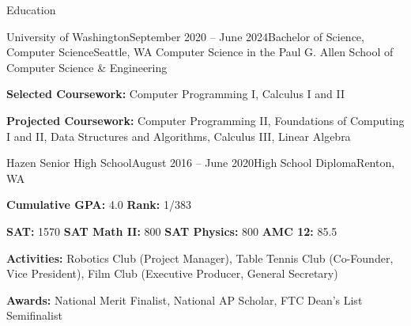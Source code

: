 \documentclass{resume} %
\begin{document}
\begin{rSection}{Education}
    \begin{rSubsection}{University of Washington}{September 2020 – June 2024}{Bachelor of Science, Computer Science}{Seattle, WA}
        Computer Science in the Paul G. Allen School of Computer Science \& Engineering
        \item {\bf Selected Coursework:} Computer Programming I, Calculus I and II
        \item {\bf Projected Coursework:} Computer Programming II, Foundations of Computing I and II, Data Structures and Algorithms, Calculus III, Linear Algebra
        \end{rSubsection}

    \begin{rSubsection}{Hazen Senior High School}{August 2016 – June 2020}{High School Diploma}{Renton, WA}
        \item {\bf Cumulative GPA:} 4.0 {\bf Rank:} 1/383
        \item {\bf SAT:} 1570 {\bf SAT Math II:} 800 {\bf SAT Physics:} 800 {\bf AMC 12:} 85.5
        \item {\bf Activities:} Robotics Club (Project Manager), Table Tennis Club (Co-Founder, Vice President), Film Club (Executive Producer, General Secretary)
        \item {\bf Awards:} National Merit Finalist, National AP Scholar, FTC Dean's List Semifinalist
        \end{rSubsection}
    \end{rSection}
\end{document}
